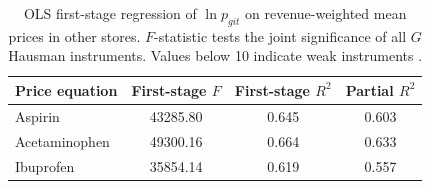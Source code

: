 \begin{table}[htbp]
  \centering
  \caption{First-Stage Diagnostics --- Hausman Instruments (Dominick's Analgesics)}
  \label{tab:first_stage_fstats}
  \begin{tabular}{lccc}
    \toprule
    \textbf{Price equation} & \textbf{First-stage $F$} & \textbf{First-stage $R^2$} & \textbf{Partial $R^2$} \\
    \midrule
    Aspirin & 43285.80 & 0.645 & 0.603 \\
    Acetaminophen & 49300.16 & 0.664 & 0.633 \\
    Ibuprofen & 35854.14 & 0.619 & 0.557 \\
    \bottomrule
  \end{tabular}
  \caption*{OLS first-stage regression of $\ln p_{git}$ on revenue-weighted mean prices in other stores. $F$-statistic tests the joint significance of all $G$ Hausman instruments. Values below 10 indicate weak instruments \citep{staiger1994instrumental}.}
\end{table}